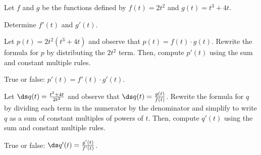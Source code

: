 \begin{pa} \label{PA:2.3}
Let $f$ and $g$ be the functions defined by $f(t) = 2t^2$ and $g(t) = t^3 + 4t$.
\ba
	\item Determine $f'(t)$ and $g'(t)$.
	\item Let $p(t) = 2t^2 (t^3 + 4t)$ and observe that $p(t) = f(t) \cdot g(t)$.  Rewrite the formula for $p$ by distributing the $2t^2$ term.  Then, compute $p'(t)$ using the sum and constant multiple rules.
	\item True or false: $p'(t) = f'(t) \cdot g'(t)$.  
	\item Let $\ds q(t) = \frac{t^3 + 4t}{2t^2}$ and observe that $\ds q(t) = \frac{g(t)}{f(t)}$.  Rewrite the formula for $q$ by dividing each term in the numerator by the denominator and simplify to write $q$ as a sum of constant multiples of powers of $t$.  Then, compute $q'(t)$ using the sum and constant multiple rules.
	\item True or false: $\ds q'(t) = \frac{g'(t)}{f'(t)}$.  
\ea

\end{pa} \afterpa